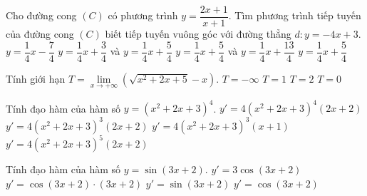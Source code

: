 \begin{ex}%
Cho đường cong $(C)$ có phương trình $y=\dfrac{2x+1}{x+1}$. Tìm phương trình tiếp tuyến của đường cong $(C)$ biết tiếp tuyến vuông góc với đường thẳng $d: y=-4x+3$.
\choice
{$y=\dfrac{1}{4}x-\dfrac{7}{4}$}
{$y=\dfrac{1}{4}x+\dfrac{3}{4}$ và $y=\dfrac{1}{4}x+\dfrac{5}{4}$}
{\True $y=\dfrac{1}{4}x+\dfrac{5}{4}$ và $y=\dfrac{1}{4}x+\dfrac{13}{4}$}
{$y=\dfrac{1}{4}x+\dfrac{5}{4}$}
\end{ex}

\begin{ex}%
Tính giới hạn $T=\lim\limits_{x\rightarrow +\infty}\left(\sqrt{x^2+2x+5}-x\right)$.
\choice
{$T=-\infty$}
{\True $T=1$}
{$T=2$}
{$T=0$}
\end{ex}

\begin{ex}%
Tính đạo hàm của hàm số $y=(x^2+2x+3)^4$.
\choice
{$y'=4(x^2+2x+3)^4(2x+2)$}
{\True $y'=4(x^2+2x+3)^3(2x+2)$}
{$y'=4(x^2+2x+3)^3(x+1)$}
{$y'=4(x^2+2x+3)^5(2x+2)$}
\end{ex}

\begin{ex}%
Tính đạo hàm của hàm số $y=\sin(3x+2)$.
\choice
{\True $y'=3\cos(3x+2)$}
{$y'=\cos(3x+2)\cdot(3x+2)$}
{$y'=\sin(3x+2)$}
{$y'=\cos(3x+2)$}
\end{ex} 


